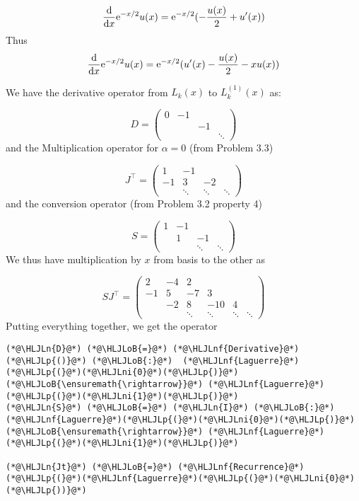 \documentclass[12pt,landscape]{article}
\newcommand{\HLJLn}[1]{#1}
\newcommand{\HLJLnf}[1]{\textcolor[RGB]{66,102,213}{#1}}
\newcommand{\HLJLni}[1]{\textcolor[RGB]{59,151,46}{#1}}
\newcommand{\HLJLoB}[1]{\textcolor[RGB]{102,102,102}{\textbf{#1}}}
\newcommand{\HLJLp}[1]{#1}
\def\D{ {\rm d} }
\def\E{ {\rm e} }
\def\dx{\D x}
\begin{document}
{\[
{\D \over \dx} \E^{-x/2} u(x) =  \E^{-x/2} (-{u(x) \over 2} +u'(x))
\]
Thus
\[
{\D \over \dx} \E^{-x/2} u(x)  = \E^{-x/2} (u'(x) -{u(x) \over 2} - x u(x))
\]
\newpage

We have the derivative operator from $L_k(x)$ to $L_k^{(1)}(x)$ as:

\[
D = \begin{pmatrix}
0 & -1 \\
  &&-1 \\
  &&&\ddots
\end{pmatrix}
\]
and the Multiplication operator for $\alpha = 0$ (from Problem 3.3)

\[
J^\top = \begin{pmatrix} 1 &-1\\
                        -1 & 3 &-2\\
                            &\ddots & \ddots & \ddots
                            \end{pmatrix}
\]
and the conversion operator (from Problem 3.2 property 4)

\[
S = \begin{pmatrix}
        1 & -1 \\ & 1 & -1 \\&&\ddots & \ddots
\end{pmatrix}
\]
We thus have multiplication by $x$ from basis to the other as

\[
S J^\top = \begin{pmatrix}
2 & -4 & 2 \\
-1 & 5 & -7 & 3 \\
& -2 & 8 & -10 & 4\\
&&\ddots&\ddots&\ddots&\ddots
\end{pmatrix}
\]
Putting everything together, we get the operator


\begin{lstlisting}
(*@\HLJLn{D}@*) (*@\HLJLoB{=}@*) (*@\HLJLnf{Derivative}@*)(*@\HLJLp{()}@*) (*@\HLJLoB{:}@*)  (*@\HLJLnf{Laguerre}@*)(*@\HLJLp{(}@*)(*@\HLJLni{0}@*)(*@\HLJLp{)}@*) (*@\HLJLoB{\ensuremath{\rightarrow}}@*) (*@\HLJLnf{Laguerre}@*)(*@\HLJLp{(}@*)(*@\HLJLni{1}@*)(*@\HLJLp{)}@*)
(*@\HLJLn{S}@*) (*@\HLJLoB{=}@*) (*@\HLJLn{I}@*) (*@\HLJLoB{:}@*) (*@\HLJLnf{Laguerre}@*)(*@\HLJLp{(}@*)(*@\HLJLni{0}@*)(*@\HLJLp{)}@*) (*@\HLJLoB{\ensuremath{\rightarrow}}@*) (*@\HLJLnf{Laguerre}@*)(*@\HLJLp{(}@*)(*@\HLJLni{1}@*)(*@\HLJLp{)}@*)

(*@\HLJLn{Jt}@*) (*@\HLJLoB{=}@*) (*@\HLJLnf{Recurrence}@*)(*@\HLJLp{(}@*)(*@\HLJLnf{Laguerre}@*)(*@\HLJLp{(}@*)(*@\HLJLni{0}@*)(*@\HLJLp{))}@*)


\end{lstlisting}}
\end{document}
